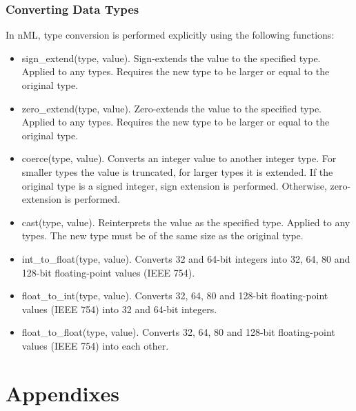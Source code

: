 \documentclass[oneside,final,14pt]{extreport}
\begin{document}
\subsection{Converting Data Types}

In nML, type conversion is performed explicitly using the following functions:

\begin{itemize}
\item sign{\_}extend(type, value).
Sign-extends the value to the specified type. Applied to any types. Requires
the new type to be larger or equal to the original type.

\item zero{\_}extend(type, value).
Zero-extends the value to the specified type. Applied to any types. Requires the new type to be larger or equal to the original type.

\item coerce(type, value).
Converts an integer value to another integer type. For smaller types the value is truncated, for larger types it is extended. If the original type is a signed integer, sign extension is performed. Otherwise, zero-extension is performed.

\item cast(type, value).
Reinterprets the value as the specified type. Applied to any types. The new type must be of the same size as the original type.

\item int{\_}to{\_}float(type, value).
Converts 32 and 64-bit integers into 32, 64, 80 and 128-bit floating-point values (IEEE 754).

\item float{\_}to{\_}int(type, value).
Converts 32, 64, 80 and 128-bit floating-point values (IEEE 754) into 32 and 64-bit integers.

\item float{\_}to{\_}float(type, value).
Converts 32, 64, 80 and 128-bit floating-point values (IEEE 754) into each other.

\end{itemize}





\chapter{Appendixes}
\end{document}
